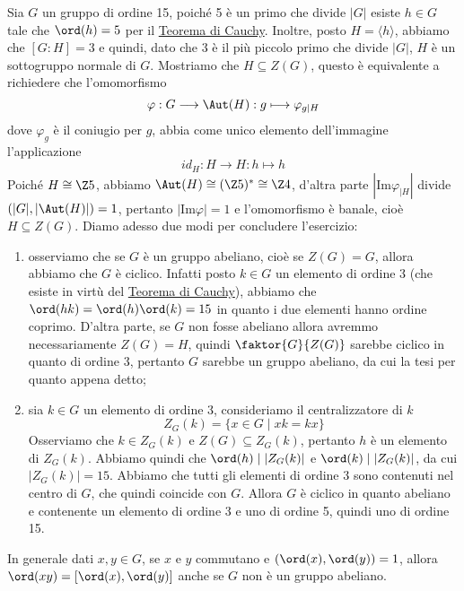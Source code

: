 \documentclass[11pt]{scrartcl}
\begin{document}
	\begin{soln}
		Sia $G$ un gruppo di ordine 15, poiché 5 è un primo che divide $|G|$
		esiste $h \in G$ tale che $\ord(h) = 5$ per il \hyperref[teorema1.44]{Teorema di Cauchy}.
		Inoltre, posto $H = \langle h\rangle$, abbiamo che $[G:H] = 3$ e quindi,
		dato che 3 è il più piccolo primo che divide $|G|$, $H$ è un sottogruppo 
		normale di $G$. Mostriamo che $H \subseteq Z(G)$, questo è equivalente a 
		richiedere che l'omomorfismo \[
		\varphi: G\longrightarrow \Aut(H) :g\longmapsto \varphi_{g\mid H}
		\]
		dove $\varphi_g$ è il coniugio per $g$, abbia come unico elemento dell'immagine
		l'applicazione
		\[
		id_H:H\longrightarrow H: h \longmapsto h
		\]
		Poiché $H \cong \Z5$, abbiamo $\Aut(H)\cong (\Z5)^* \cong \Z4$, d'altra 
		parte $|\mathrm{Im}\varphi_{\mid H}|$ divide $(|G|, |\Aut(H)|) = 1$, pertanto
		$|\mathrm{Im}\varphi| = 1$ e l'omomorfismo è banale, cioè $H \subseteq Z(G)$.
		Diamo adesso due modi per concludere l'esercizio:
		\begin{enumerate}[(1)]
			\item osserviamo che se $G$ è un gruppo abeliano, cioè se $Z(G) = G$,
			allora abbiamo che $G$ è ciclico. Infatti posto $k \in G$ un elemento di 
			ordine 3 (che esiste in virtù del \hyperref[teorema1.44]{Teorema di Cauchy}),
			abbiamo che $\ord(hk) = \ord(h)\ord(k) = 15$ in quanto i due elementi hanno
			ordine coprimo. D'altra parte, se $G$ non fosse abeliano allora avremmo 
			necessariamente $Z(G) = H$, quindi $\faktor{G}{Z(G)}$ sarebbe ciclico 
			in quanto di ordine 3, pertanto $G$ sarebbe un gruppo abeliano, da cui 
			la tesi per quanto appena detto;
			\item sia $k \in G$ un elemento di ordine 3, consideriamo il centralizzatore
			di $k$
			\[
			Z_G(k) = \{x \in G\mid xk = kx\}
			\]Osserviamo che $k \in Z_G(k)$ e $Z(G) \subseteq Z_G(k)$, pertanto $h$ è un elemento 
			di $Z_G(k)$. Abbiamo quindi che $\ord(h)\mid |Z_G(k)|$ e $\ord(k)\mid |Z_G(k)|$, 
			da cui $|Z_G(k)| = 15$. Abbiamo che tutti gli elementi di ordine 3
			sono contenuti nel centro di $G$, che quindi coincide con $G$. Allora $G$
			è ciclico in quanto abeliano e contenente un elemento di ordine 3 e uno
			di ordine 5, quindi uno di ordine 15.
		\end{enumerate}
	\end{soln}
	
	\begin{remark}
		In generale dati $x, y\in G$, se $x$ e $y$ commutano e $(\ord(x),\ord(y)) = 1$, allora 
		$\ord(xy) = [\ord(x), \ord(y)]$ anche se $G$ non è un gruppo abeliano.
	\end{remark}
	
\end{document}
